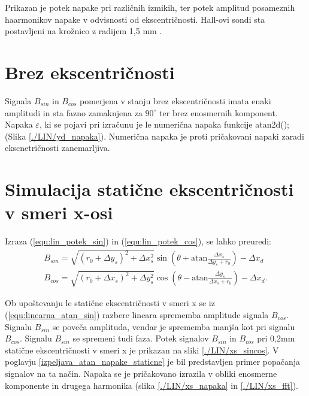 Prikazan je potek napake pri različnih izmikih, ter potek amplitud posameznih haarmonikov napake v odvisnosti od ekscentričnosti.
Hall-ovi sondi sta postavljeni na krožnico z radijem 1,5 mm \cite{AM8192}.
\section{Brez ekscentričnosti}
Signala $B_{sin}$ in $B_{cos}$ pomerjena v stanju brez ekscentričnosti imata enaki amplitudi in sta fazno zamaknjena za $90^{\circ}$ ter brez enosmernih komponent. Napaka $\varepsilon$, ki se pojavi pri izračunu je le numerična napaka funkcije atan2d(); (Slika \ref{./LIN/yd_napaka}). Numerična napaka je proti pričakovani napaki zaradi ekscnetričnosti zanemarljiva.
\section{Simulacija statične ekscentričnosti v smeri x-osi}
Izraza (\ref{equ:lin_potek_sin}) in (\ref{equ:lin_potek_cos}), se lahko preuredi:
\begin{eqnarray}
\label{equ:linearna_atan_sin}
B_{sin}= \sqrt{(r_0+\Delta y_s)^2+\Delta x_s^2} \sin(\theta+  \mathrm{ atan} \frac{\Delta x_s}{\Delta y_s +r_0})-\Delta x_d\\
\label{equ:linearna_atan_cos}
B_{cos}= \sqrt{(r_0+\Delta x_s)^2+\Delta y_s^2} \cos(\theta-  \mathrm{ atan} \frac{\Delta y_s}{\Delta x_s +r_0}) -\Delta x_d.
\end{eqnarray}

Ob upoštevanju le statične ekscentričnosti v smeri x se iz (\ref{equ:linearna_atan_sin}) razbere lineara sprememba amplitude signala $B_{cos}$.
Signalu $B_{sin}$ se poveča amplituda, vendar je sprememba manjša kot pri signalu $B_{cos}$. Signalu $B_{sin}$ se spremeni tudi faza.
Potek signalov $B_{sin}$ in $B_{cos}$ pri 0,2mm statične ekscentričnosti v smeri x je prikazan na sliki \ref{./LIN/xs_sincos}.
V poglavju \ref{izpeljava_atan_napake_staticne} je bil predstavljen primer popačanja signalov na ta način.
Napaka se je pričakovano izrazila v obliki enosmerne komponente in drugega harmonika (slika \ref{./LIN/xs_napaka} in \ref{./LIN/xs_fft}).
